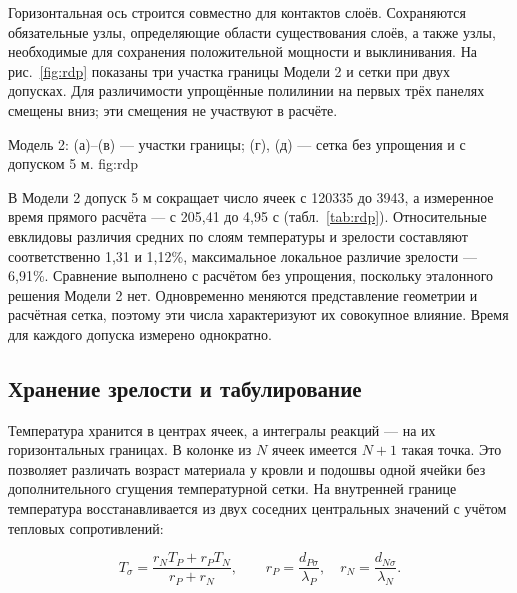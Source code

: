 Горизонтальная ось строится совместно для контактов слоёв.
Сохраняются обязательные узлы, определяющие области существования
слоёв, а также узлы, необходимые для сохранения положительной мощности
и выклинивания. На рис.~\ref{fig:rdp} показаны три участка границы
Модели 2 и сетки при двух допусках. Для различимости упрощённые
полилинии на первых трёх панелях смещены вниз; эти смещения
не участвуют в расчёте.

  {Модель 2: (а)--(в) --- участки границы; (г), (д) --- сетка
  без упрощения и с допуском 5 м.}
  {fig:rdp}

В Модели 2 допуск 5 м сокращает число ячеек с 120335 до 3943,
а измеренное время прямого расчёта --- с 205,41 до 4,95 с
(табл.~\ref{tab:rdp}). Относительные евклидовы различия средних
по слоям температуры и зрелости составляют соответственно 1,31
и 1,12\%, максимальное локальное различие зрелости --- 6,91\%.
Сравнение выполнено с расчётом без упрощения, поскольку эталонного
решения Модели 2 нет. Одновременно меняются представление геометрии
и расчётная сетка, поэтому эти числа характеризуют их совокупное
влияние. Время для каждого допуска измерено однократно.



\subsection{Хранение зрелости и табулирование}

Температура хранится в центрах ячеек, а интегралы реакций ---
на их горизонтальных границах. В колонке из $N$ ячеек имеется $N+1$
такая точка. Это позволяет различать возраст материала у кровли
и подошвы одной ячейки без дополнительного сгущения температурной сетки.
На внутренней границе температура восстанавливается из двух соседних
центральных значений с учётом тепловых сопротивлений:

\begin{equation}
 T_\sigma=\frac{r_NT_P+r_PT_N}{r_P+r_N},\qquad
 r_P=\frac{d_{P\sigma}}{\lambda_P},\quad
 r_N=\frac{d_{N\sigma}}{\lambda_N}.
\end{equation}

